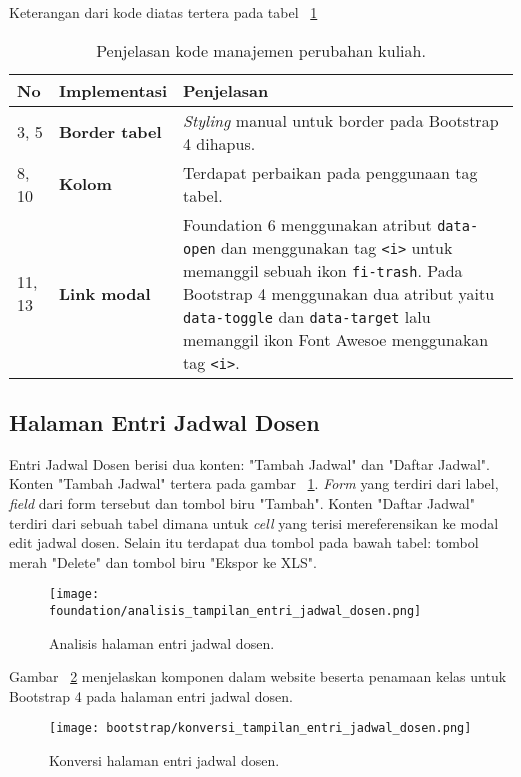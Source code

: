 Keterangan dari kode diatas tertera pada tabel ~\ref{tabel:manajemenPerubahanKuliah}
\begin{table}[H]
	\centering
	\caption{Penjelasan kode manajemen perubahan kuliah.}
	\begin{tabularx}{\textwidth}{llX}
		\toprule
		No & Implementasi     & Penjelasan \\
		\midrule
		3, 5 & \textbf{Border tabel} & \textit{Styling} manual untuk border pada Bootstrap 4 dihapus.\\
		8, 10 & \textbf{Kolom} & Terdapat perbaikan pada penggunaan tag tabel.\\		
		11, 13 & \textbf{Link modal} & Foundation 6 menggunakan atribut \texttt{data-open} dan menggunakan tag \texttt{<i>} untuk memanggil sebuah ikon \texttt{fi-trash}. Pada Bootstrap 4 menggunakan dua atribut yaitu \texttt{data-toggle} dan \texttt{data-target} lalu memanggil ikon Font Awesoe menggunakan tag \texttt{<i>}.\\
		\bottomrule
	\end{tabularx}%
	\label{tabel:manajemenPerubahanKuliah}
\end{table}  

\subsection{Halaman Entri Jadwal Dosen}
Entri Jadwal Dosen berisi dua konten: "Tambah Jadwal" dan "Daftar Jadwal". Konten "Tambah Jadwal" tertera pada gambar ~\ref{fig:analisisEntriJadwalDosen}. \textit{Form} yang terdiri dari label, \textit{field} dari form tersebut dan tombol biru "Tambah". Konten "Daftar Jadwal" terdiri dari sebuah tabel dimana untuk \textit{cell} yang terisi mereferensikan ke modal edit jadwal dosen. Selain itu terdapat dua tombol pada bawah tabel: tombol merah "Delete" dan tombol biru "Ekspor ke XLS".
\begin{figure} [H]
	\centering  
	\texttt{[image: foundation/analisis\_tampilan\_entri\_jadwal\_dosen.png]}
	\caption{Analisis halaman entri jadwal dosen.}
	\label{fig:analisisEntriJadwalDosen}
\end{figure}

\noindent Gambar ~\ref{fig:konversiEntriJadwalDosen} menjelaskan komponen dalam website beserta penamaan kelas untuk Bootstrap 4 pada halaman entri jadwal dosen.\\
\begin{figure} [H]
	\centering  
	\texttt{[image: bootstrap/konversi\_tampilan\_entri\_jadwal\_dosen.png]}
	\caption{Konversi halaman entri jadwal dosen.}
	\label{fig:konversiEntriJadwalDosen}
\end{figure}

